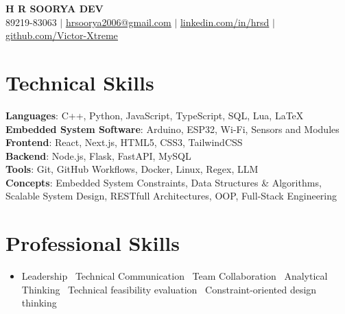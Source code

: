 \documentclass[letterpaper,11pt]{article}
\begin{document}

\begin{center}
    \textbf{\Huge \scshape H R SOORYA DEV} \\ \vspace{1pt}
    \small 89219-83063 $|$ \href{mailto:hrsoorya2006@gmail.com}{\underline{hrsoorya2006@gmail.com}} $|$ 
    \href{https://www.linkedin.com/in/hrsd/}{\underline{linkedin.com/in/hrsd}} $|$
    \href{https://github.com/Victor-Xtreme}{\underline{github.com/Victor-Xtreme}}
\end{center}


\section{Technical Skills}
\begin{itemize}[leftmargin=0.15in, label={}]
\small{
  \item{
  \textbf{Languages}{: C++, Python, JavaScript, TypeScript, SQL, Lua, LaTeX} \\
  \textbf{Embedded System Software}{: Arduino, ESP32, Wi-Fi, Sensors and Modules} \\
  \textbf{Frontend}{: React, Next.js, HTML5, CSS3, TailwindCSS} \\
  \textbf{Backend}{: Node.js, Flask, FastAPI, MySQL} \\
  \textbf{Tools}{: Git, GitHub Workflows, Docker, Linux, Regex, LLM} \\
  \textbf{Concepts}{: Embedded System Constraints, Data Structures \& Algorithms, Scalable System Design, RESTfull Architectures, OOP, Full-Stack Engineering}
  }
}
\end{itemize}
\vspace{-8pt}

\section{Professional Skills}
\begin{itemize}[leftmargin=0.15in]
\item Leadership \textbar\ Technical Communication \textbar\ Team Collaboration \textbar\ Analytical Thinking \textbar\ Technical feasibility evaluation \textbar\ Constraint-oriented design thinking
\end{itemize}
\vspace{-8pt}
\end{document}
